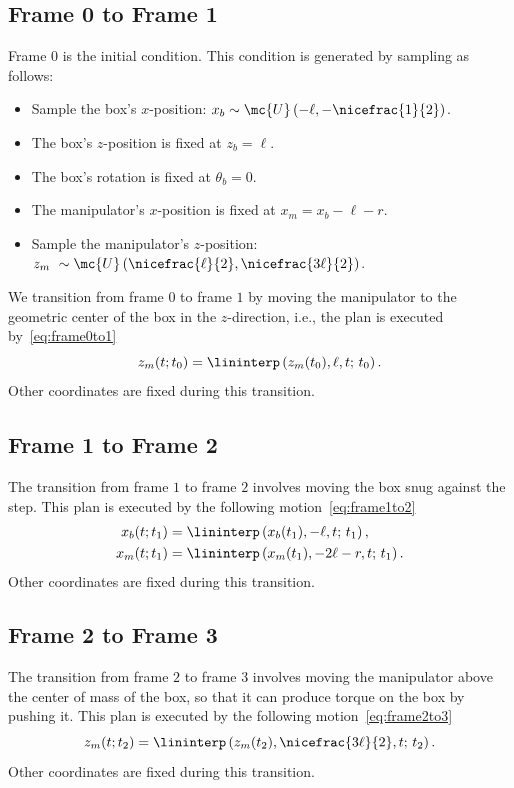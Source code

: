 \subsection{Frame 0 to Frame 1}
\label{sec:frame0to1}
%
Frame $0$ is the initial condition. This condition is generated by sampling 
as follows:
%
\begin{itemize}
  \item Sample the box's $x$-position: 
  $x_b \sim \mc{U}\left(-\ell, -\nicefrac{1}{2}\right)$.
  \item The box's $z$-position is fixed at $z_b = \ell$.
  \item The box's rotation is fixed at $\theta_b = 0$.
  \item The manipulator's $x$-position is fixed at $x_m = x_b - \ell - r$.
  \item Sample the manipulator's $z$-position:
  $z_m ~\sim \mc{U}\left(\nicefrac{\ell}{2}, \nicefrac{3\ell}{2}\right)$.
\end{itemize}
%
We transition from frame $0$ to frame $1$ by moving the manipulator to the
geometric center of the box in the $z$-direction, i.e., the plan is executed 
by~\eqref{eq:frame0to1}
\begin{equation}
  z_m(t; t_0) = \lininterp\left(z_m(t_0), \ell, t; \, t_0\right).
  \label{eq:frame0to1}
\end{equation}
%
Other coordinates are fixed during this transition. 


\subsection{Frame 1 to Frame 2}
\label{sec:frame1to2}
%
The transition from frame $1$ to frame $2$ involves moving the box snug against
the step. This plan is executed by the following motion~\eqref{eq:frame1to2}
%
\begin{align}
\begin{split}
  x_b(t; t_1) &= \lininterp\left(x_b(t_1), -\ell, t; \, t_1\right), \\
  x_m(t; t_1) &= \lininterp\left(x_m(t_1), -2\ell-r, t; \, t_1\right). \\
\end{split}
  \label{eq:frame1to2}
\end{align}
%
Other coordinates are fixed during this transition. 


\subsection{Frame 2 to Frame 3}
\label{sec:frame2to3}
%
The transition from frame $2$ to frame $3$ involves moving the manipulator above
the center of mass of the box, so that it can produce torque on the box by
pushing it. This plan is executed by the following motion~\eqref{eq:frame2to3}
%
\begin{equation}
  z_m(t; t_2) = \lininterp\left(z_m(t_2), \nicefrac{3\ell}{2}, t; \, t_2\right).
  \label{eq:frame2to3}
\end{equation}
%
Other coordinates are fixed during this transition.


